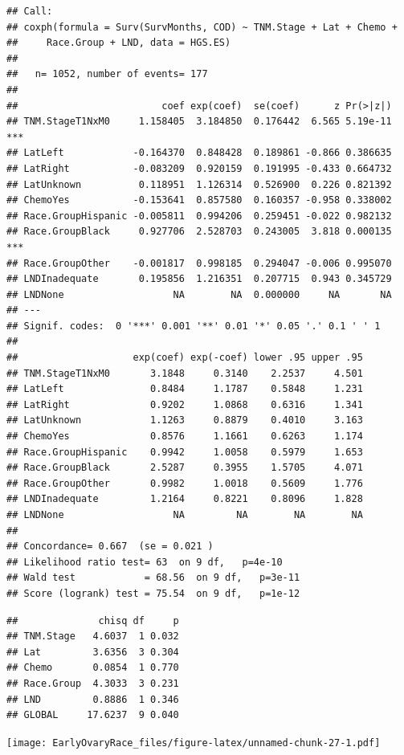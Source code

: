 \documentclass[
]{article}
\begin{document}
\begin{verbatim}
## Call:
## coxph(formula = Surv(SurvMonths, COD) ~ TNM.Stage + Lat + Chemo + 
##     Race.Group + LND, data = HGS.ES)
## 
##   n= 1052, number of events= 177 
## 
##                         coef exp(coef)  se(coef)      z Pr(>|z|)    
## TNM.StageT1NxM0     1.158405  3.184850  0.176442  6.565 5.19e-11 ***
## LatLeft            -0.164370  0.848428  0.189861 -0.866 0.386635    
## LatRight           -0.083209  0.920159  0.191995 -0.433 0.664732    
## LatUnknown          0.118951  1.126314  0.526900  0.226 0.821392    
## ChemoYes           -0.153641  0.857580  0.160357 -0.958 0.338002    
## Race.GroupHispanic -0.005811  0.994206  0.259451 -0.022 0.982132    
## Race.GroupBlack     0.927706  2.528703  0.243005  3.818 0.000135 ***
## Race.GroupOther    -0.001817  0.998185  0.294047 -0.006 0.995070    
## LNDInadequate       0.195856  1.216351  0.207715  0.943 0.345729    
## LNDNone                   NA        NA  0.000000     NA       NA    
## ---
## Signif. codes:  0 '***' 0.001 '**' 0.01 '*' 0.05 '.' 0.1 ' ' 1
## 
##                    exp(coef) exp(-coef) lower .95 upper .95
## TNM.StageT1NxM0       3.1848     0.3140    2.2537     4.501
## LatLeft               0.8484     1.1787    0.5848     1.231
## LatRight              0.9202     1.0868    0.6316     1.341
## LatUnknown            1.1263     0.8879    0.4010     3.163
## ChemoYes              0.8576     1.1661    0.6263     1.174
## Race.GroupHispanic    0.9942     1.0058    0.5979     1.653
## Race.GroupBlack       2.5287     0.3955    1.5705     4.071
## Race.GroupOther       0.9982     1.0018    0.5609     1.776
## LNDInadequate         1.2164     0.8221    0.8096     1.828
## LNDNone                   NA         NA        NA        NA
## 
## Concordance= 0.667  (se = 0.021 )
## Likelihood ratio test= 63  on 9 df,   p=4e-10
## Wald test            = 68.56  on 9 df,   p=3e-11
## Score (logrank) test = 75.54  on 9 df,   p=1e-12
\end{verbatim}

\begin{verbatim}
##              chisq df     p
## TNM.Stage   4.6037  1 0.032
## Lat         3.6356  3 0.304
## Chemo       0.0854  1 0.770
## Race.Group  4.3033  3 0.231
## LND         0.8886  1 0.346
## GLOBAL     17.6237  9 0.040
\end{verbatim}

\texttt{[image: EarlyOvaryRace\_files/figure-latex/unnamed-chunk-27-1.pdf]}
\end{document}
